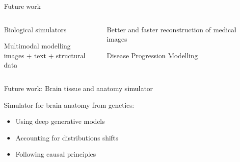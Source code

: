 \documentclass[8pt,xcolor=table,aspectratio=169]{beamer}
\begin{document}
\begin{frame}{Future work}


\vspace{-2em}
\begin{columns}[t]
\begin{column}{0.5\textwidth}
\centering

Biological simulators\\

\vt
\vt

Multimodal modelling\\
images + text + structural data  

\end{column}
\begin{column}{0.5\textwidth}
\centering

Better and faster reconstruction of medical images\\

\vt
\vt

Disease Progression Modelling



\end{column}
\end{columns}


\end{frame}


\begin{frame}{Future work: Brain tissue and anatomy simulator}


Simulator for brain anatomy from genetics:
\begin{itemize}
 \item Using deep generative models
 \item Accounting for distributions shifts
 \item Following causal principles
\end{itemize}

\vt


\end{frame}
\end{document}
